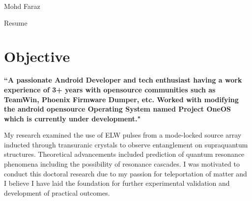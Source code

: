 \documentclass[
	10pt, %
]{FreemanCV}
\begin{document}
\begin{paracol}{2} %


\parbox[][0.11\textheight][c]{\linewidth}{ %
	\centering %
	
	{\sffamily\Huge Mohd Faraz} %
	
	\medskip %
	
	{\cursivefont\Huge\textcolor{headings}{Resume}}
	
	\vfill %
}


\section{Objective}

{\raggedright\textbf{``A passionate Android Developer and tech enthusiast having a work experience of 3+ years with opensource communities such as TeamWin, Phoenix Firmware Dumper, etc. Worked with modifying the android opensource Operating System named Project OneOS which is currently under development."}\par}

\medskip %

My research examined the use of ELW pulses from a mode-locked source array inducted through transuranic crystals to observe entanglement on supraquantum structures. Theoretical advancements included prediction of quantum resonance phenomena including the possibility of resonance cascades. I was motivated to conduct this doctoral research due to my passion for teleportation of matter and I believe I have laid the foundation for further experimental validation and development of practical outcomes.

\medskip %



\end{paracol}
\end{document}
